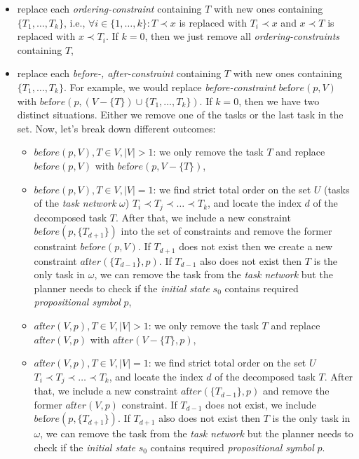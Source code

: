 \begin{itemize}
    \item replace each \emph{ordering-constraint} containing $T$ with new ones containing $\{ T_1, \dots, T_k \}$, i.e., $\forall i \in \{ 1, \dots, k \}: T \prec x$ is replaced with $T_i \prec x$ and $x \prec T$ is replaced with $x \prec T_i$. If $k = 0$, then we just remove all \emph{ordering-constraints} containing $T$,
        
    \item replace each \emph{before-, after-constraint} containing $T$ with new ones containing $\{ T_1, \dots, T_k \}$. For example, we would replace \emph{before-constraint} $be\text{f}ore(p,V)$ with $be\text{f}ore(p, (V - \{T\}) \cup \{ T_1, \dots, T_k \})$. If $k = 0$, then we have two distinct situations. Either we remove one of the tasks or the last task in the set. Now, let's break down different outcomes:

        \begin{itemize}
            \item $be\text{f}ore(p, V), T \in V, |V| > 1$: we only remove the task $T$ and replace $be\text{f}ore(p, V)$ with $be\text{f}ore(p, V - \{ T \})$,

            \item $be\text{f}ore(p, V), T \in V, |V| = 1$: we find strict total order on the set $U$ (tasks of the \emph{task network} $\omega$) $T_i \prec T_j \prec \dots \prec T_k$, and locate the index $d$ of the decomposed task $T$. After that, we include a new constraint $be\text{f}ore(p, \{ T_{d+1} \})$ into the set of constraints and remove the former constraint $be\text{f}ore(p, V)$. If $T_{d+1}$ does not exist then we create a new constraint $a\text{f}ter(\{ T_{d-1} \}, p)$. If $T_{d-1}$ also does not exist then $T$ is the only task in $\omega$, we can remove the task from the \emph{task network} but the planner needs to check if the \emph{initial state} $s_0$ contains required \emph{propositional symbol} $p$,

            \item $a\text{f}ter(V, p), T \in V, |V| > 1$: we only remove the task $T$ and replace $a\text{f}ter(V, p)$ with $a\text{f}ter(V - \{ T \}, p)$,

            \item $a\text{f}ter(V, p), T \in V, |V| = 1$: we find strict total order on the set $U$ $T_i \prec T_j \prec \dots \prec T_k$, and locate the index $d$ of the decomposed task $T$. After that, we include a new constraint $a\text{f}ter(\{ T_{d-1} \}, p)$ and remove the former $a\text{f}ter(V, p)$ constraint. If $T_{d-1}$ does not exist, we include $be\text{f}ore(p, \{ T_{d+1} \})$. If $T_{d+1}$ also does not exist then $T$ is the only task in $\omega$, we can remove the task from the \emph{task network} but the planner needs to check if the \emph{initial state} $s_0$ contains required \emph{propositional symbol} $p$.
        \end{itemize}
\end{itemize}

